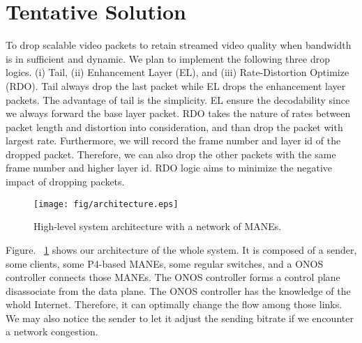 \section{Tentative Solution} \label{sec:Tentive Soution}

To drop scalable video packets to retain streamed video quality when bandwidth is in sufficient and dynamic. We plan to implement the following three drop logics. (i) Tail, (ii) Enhancement Layer (EL), and (iii) Rate-Distortion Optimize (RDO). Tail always drop the last packet while EL drops the enhancement layer packets.  The advantage of tail is the simplicity. EL ensure the decodability since we always forward the base layer packet. RDO takes the nature of rates between packet length and distortion into consideration, and than drop the packet with largest rate. Furthermore, we will record the frame number and layer id of the dropped packet. Therefore, we can also drop the other packets with the same frame number and higher layer id. RDO logic aims to minimize the negative impact of dropping packets. 

\begin{figure}[tbh]
    \centering
    \texttt{[image: fig/architecture.eps]}
    \caption{High-level system architecture with a network of MANEs.}
\vspace{-0.1cm}
    \label{architecture} 
\end{figure}

Figure. ~\ref{architecture} shows our architecture of the whole system. It is composed of a sender, some clients, some P4-based MANEs, some regular switches, and a ONOS controller connects those MANEs. The ONOS controller forms a control plane disassociate from the data plane. The ONOS controller has the knowledge of the whold Internet. Therefore, it can optimally change the flow among those links. We may also notice the sender to let it adjust the sending bitrate if we encounter a network congestion. 